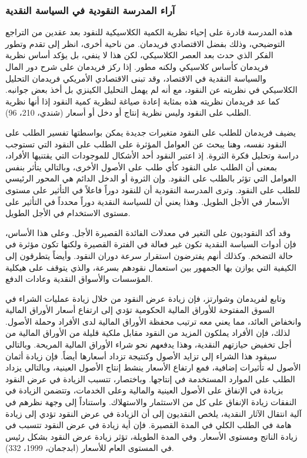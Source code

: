 \documentclass[10pt,a4paper]{report}
\begin{document}
\begin{doublespacing}
\subsubsection{آراء المدرسة النقودية في السياسة النقدية}
هذه المدرسة قادرة على إحياء نظرية الكمية الكلاسيكية للنقود بعد عقدين من التراجع التوضيحي، وذلك بفضل الاقتصادي فريدمان. من ناحية أخرى، انظر إلى تقدم وتطور الفكر الذي حدث بعد العصر الكلاسيكي، لكن هذا لا ينفي، بل يؤكد أساس نظرية فريدمان كأساس كلاسيكي ولكنه مطور. إذا ركز فريدمان على شرح دور المال والسياسة النقدية في الاقتصاد، وقد تبنى الاقتصادي الأمريكي فريدمان التحليل الكلاسيكي في نظريته عن النقود، مع أنه لم يهمل التحليل الكينزي بل أخذ بعض جوانبه. كما عد فريدمان نظريته هذه بمثابة إعادة صياغة لنظرية كمية النقود إذا أنها نظرية الطلب على النقود وليس نظرية إنتاج أو دخل أو أسعار (شندي، 210، 96).

يضيف فريدمان للطلب على النقود متغيرات جديدة يمكن بواسطتها تفسير الطلب على النقود نفسه، وهنا يبحث عن العوامل المؤثرة على الطلب على النقود التي تستوجب دراسة وتحليل فكرة الثروة. إذ اعتبر النقود أحد الأشكال للموجودات التي يقتنيها الأفراد، بمعنى أن الطلب على النقود كأي طلب على الأصول الأخرى، وبالتالي يتأثر بنفس العوامل التي تؤثر بالطلب على النقود. وإن الثروة أو الدخل الدائم هي المحور الرئيسي للطلب على النقود. وترى المدرسة النقودية أن للنقود دوراً فاعلاً في التأثير على مستوى الأسعار في الأجل الطويل. وهذا يعني أن للسياسة النقدية دوراً محدداً في التأثير على مستوى الاستخدام في الأجل الطويل.

وقد أكد النقوديون على التغير في معدلات الفائدة القصيرة الأجل. وعلى هذا الأساس، فإن أدوات السياسة النقدية تكون غير فعالة في الفترة القصيرة ولكنها تكون مؤثرة في حالة التضخم. وكذلك أنهم يفترضون استقرار سرعة دوران النقود. وأيضاً يتطرقون إلى الكيفية التي يوازن بها الجمهور بين استعمال نقودهم بسرعة، والذي يتوقف على هيكلية المؤسسات والأسواق النقدية  وعادات الدفع.

وتابع لفريدمان وشوارتز، فإن زيادة عرض النقود من خلال زيادة عمليات الشراء في السوق المفتوحة للأوراق المالية الحكومية تؤدي إلى ارتفاع أسعار الأوراق المالية وانخفاض العائد، مما يعني معه ترتيب محفظة الأوراق المالية لدى الأفراد وحملة الأصول. لذلك، فإن الأفراد يملكون المزيد من النقود مقابل ملكية قليلة من الأوراق المالية من أجل تخفيض حيازتهم النقدية، وهذا يدفعهم نحو شراء الأوراق المالية المريحة. وبالتالي سيقود هذا الشراء إلى تزايد الأصول وكنتيجة تزداد أسعارها أيضاً. فإن زيادة أثمان الأصول له تأثيرات إضافية، فمع ارتفاع الأسعار ينشط إنتاج الأصول العينية، وبالتالي يزداد الطلب على الموارد المستخدمة في إنتاجها. وباختصار، تتسبب الزيادة في عرض النقود بزيادة في الإنفاق على الأصول العينية والمالية وعلى الخدمات، وتتضمن الزيادة في النفقات زيادة الإنفاق على كل من الاستثمار والاستهلاك. واستناداً إلى وجهة نظرهم في آلية انتقال الآثار النقدية، يلخص النقديون إلى أن الزيادة في عرض النقود تؤدي إلى زيادة هامة في الطلب الكلي في المدة القصيرة. فإن أية زيادة في عرض النقود تتسبب في زيادة الناتج ومستوى الأسعار. وفي المدة الطويلة، تؤثر زيادة عرض النقود بشكل رئيس في المستوى العام للأسعار (ابدجمان، 1999، 332).


\end{doublespacing}
\end{document}
